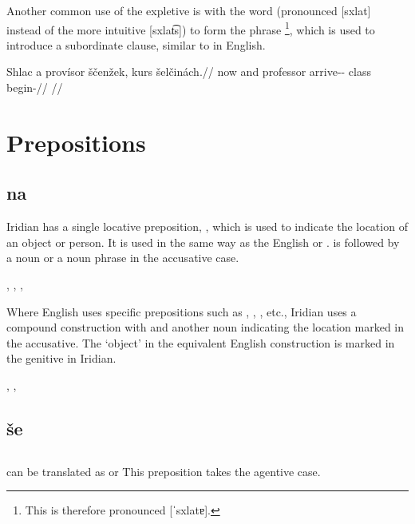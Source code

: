 Another common use of the expletive  is with the word  (pronounced [sxlat] instead of the more intuitive [sxlat͡s]) to form the phrase \footnote{This is therefore pronounced [ˈsxlatɐ].}, which is used to introduce a subordinate clause, similar to  in English.

\pex
\begingl
    \gla Shlac a provísor ščenžek, kurs šelčinách.//
    \glb now and professor arrive-\Av{}-\Pf{} class begin-//
    \glft {}//
\endgl
\xe


\section{Prepositions}
\label{sec:prepositions}

\subsection{na}

Iridian has a single locative preposition, , which is used to indicate the location of an object or person. It is used in the same way as the English  or .  is followed by a noun or a noun phrase in the accusative case.

\pex
\a {}, 
\a {}, 
\a {}, 
\xe

Where English uses specific prepositions such as , , , etc., Iridian uses a compound construction with  and another noun indicating the location marked in the accusative. The `object' in the equivalent English construction is marked in the genitive in Iridian.

\pex
\a {}, 
\a {}, 
\xe

\subsection{še}

\subsection{}

 can be translated as  or  This preposition takes the agentive case.

